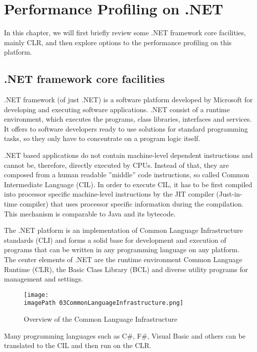 \chapter{Performance Profiling on .NET}

In this chapter, we will first briefly review some .NET framework core facilities, mainly CLR, and then explore options to the performance profiling on this platform. 

\section{.NET framework core facilities}
.NET framework (of just .NET) is a software platform developed by Microsoft for developing and executing software applications. .NET  consist of a runtime environment, which executes the programs, class libraries, interfaces and services. It offers to software developers ready to use solutions for standard programming tasks, so they only have to concentrate on a program logic itself.

.NET based applications do not contain machine-level dependent instructions and cannot be, therefore, directly executed by CPUs. Instead of that, they are composed from a human readable ''middle'' code instructions, so called Common Intermediate Language (CIL). In order to execute CIL, it has to be first compiled into processor specific machine-level instructions by the JIT compiler (Just-in-time compiler) that uses processor specific information during the compilation. This mechanism is comparable to Java and its bytecode.

The .NET platform is an implementation of Common Language Infrastructure standards (CLI) and forms a solid base for development and execution of programs that can be written in any programming language on any platform. The center elements of .NET are the runtime environment Common Language Runtime (CLR), the Basic Class Library (BCL) and diverse utility programs for management and settings.

\begin{figure}
	\centering
		\texttt{[image: \\imagePath 03CommonLanguageInfrastructure.png]}
		\caption{Overview of the Common Language Infrastructure \cite{OCLI} }
	\label{fig:03CommonLanguageInfrastructure}
\end{figure}

Many programming languages such as C\#, F\#, Visual Basic and others can be translated to the CIL and then run on the CLR. 


